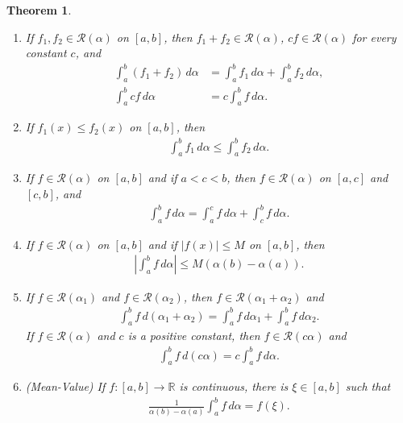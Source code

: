 \documentclass[11pt]{book}
\newtheorem{theorem}{Theorem}[chapter]
\theoremstyle{definition}
\numberwithin{equation}{chapter}
\begin{document}
\begin{theorem}
~\begin{enumerate}[label=(\alph*)]\label{th_59}
    \item If $f_1, f_2 \in \mathscr{R}(\alpha)$ on $[a,b]$, then $f_1 + f_2 \in \mathscr{R}(\alpha)$, $cf \in \mathscr{R}(\alpha)$ for every constant $c$, and
    \begin{align*}
        \int^b_a (f_1 + f_2) \,d\alpha & = \int^b_a f_1 \,d\alpha + \int^b_a f_2 \,d\alpha, \\
        \int^b_a cf \,d\alpha & = c \int^b_a f \,d\alpha.
    \end{align*} \label{th_59_a}
    
    \item If $f_1(x) \leq f_2(x)$ on $[a,b]$, then
    \begin{align*}
        \int^b_a f_1 \,d\alpha \leq \int^b_a f_2 \,d\alpha.
    \end{align*} \label{th_59_b}
    
    \item If $f \in \mathscr{R}(\alpha)$ on $[a,b]$ and if $a < c < b$, then $f \in \mathscr{R}(\alpha)$ on $[a,c]$ and $[c,b]$, and
    \begin{align*}
        \int^b_a f \,d\alpha = \int^c_a f \,d\alpha + \int^b_c f \,d\alpha.
    \end{align*} \label{th_59_c}
    
    \item If $f \in \mathscr{R}(\alpha)$ on $[a,b]$ and if $\left|f(x)\right| \leq M$ on $[a,b]$, then
    \begin{align*}
        \left|\int^b_a f \,d\alpha\right| \leq M \left(\alpha(b) - \alpha(a)\right).
    \end{align*} \label{th_59_d}
    
    \item If $f \in \mathscr{R}(\alpha_1)$ and $f \in \mathscr{R}(\alpha_2)$, then $f \in \mathscr{R}(\alpha_1 + \alpha_2)$ and
    \begin{align*}
        \int^b_a f \,d(\alpha_1 + \alpha_2) = \int^b_a f \,d\alpha_1 + \int^b_a f \,d\alpha_2.
    \end{align*}
    If $f \in \mathscr{R}(\alpha)$ and $c$ is a positive constant, then $f \in \mathscr{R}(c\alpha)$ and 
    \begin{align*}
        \int^b_a f \,d(c\alpha) = c \int^b_a f \,d\alpha.
    \end{align*} \label{th_59_e}
    
    \item (Mean-Value) If $f: [a,b] \to \mathbb{R}$ is continuous, there is $\xi \in [a,b]$ such that
    \begin{align*}
        \frac{1}{\alpha(b) - \alpha(a)} \int^b_a f \,d\alpha = f(\xi).
    \end{align*} \label{th_59_f}
\end{enumerate}
\end{theorem}
\end{document}
